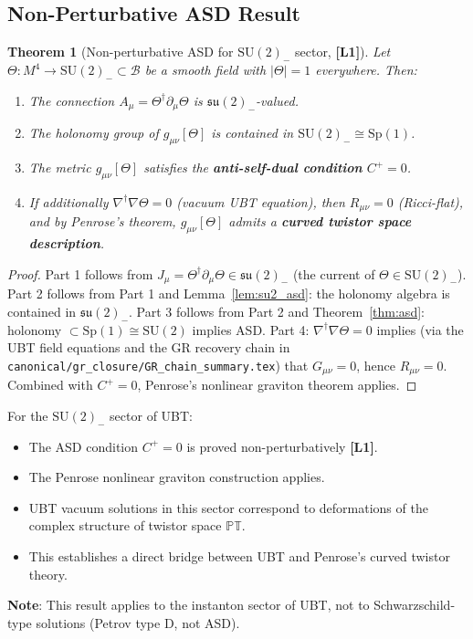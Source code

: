 \documentclass[11pt,a4paper]{article}
\newtheorem{theorem}{Theorem}[section]
\theoremstyle{definition}
\theoremstyle{remark}
\begin{document}
\subsection{Non-Perturbative ASD Result}

\begin{theorem}[Non-perturbative ASD for $\mathrm{SU}(2)_-$ sector, \textbf{[L1]}]
\label{thm:asd_nonperturbative}
Let $\Theta: M^4 \to \mathrm{SU}(2)_- \subset \mathcal{B}$ be a smooth
field with $|\Theta| = 1$ everywhere.  Then:
\begin{enumerate}
  \item The connection $A_\mu = \Theta^\dagger\partial_\mu\Theta$ is
        $\mathfrak{su}(2)_-$-valued.
  \item The holonomy group of $g_{\mu\nu}[\Theta]$ is contained in
        $\mathrm{SU}(2)_- \cong \mathrm{Sp}(1)$.
  \item The metric $g_{\mu\nu}[\Theta]$ satisfies the \textbf{anti-self-dual
        condition} $C^+ = 0$.
  \item If additionally $\nabla^\dagger\nabla\Theta = 0$ (vacuum UBT equation),
        then $R_{\mu\nu} = 0$ (Ricci-flat), and by Penrose's theorem,
        $g_{\mu\nu}[\Theta]$ admits a \textbf{curved twistor space description}.
\end{enumerate}
\end{theorem}

\begin{proof}
Part 1 follows from $J_\mu = \Theta^\dagger\partial_\mu\Theta \in \mathfrak{su}(2)_-$
(the current of $\Theta \in \mathrm{SU}(2)_-$).
Part 2 follows from Part 1 and Lemma~\ref{lem:su2_asd}: the holonomy algebra
is contained in $\mathfrak{su}(2)_-$.
Part 3 follows from Part 2 and Theorem~\ref{thm:asd}: holonomy $\subset
\mathrm{Sp}(1) \cong \mathrm{SU}(2)$ implies ASD.
Part 4: $\nabla^\dagger\nabla\Theta = 0$ implies (via the UBT field equations
and the GR recovery chain in \texttt{canonical/gr\_closure/GR\_chain\_summary.tex})
that $G_{\mu\nu} = 0$, hence $R_{\mu\nu} = 0$.  Combined with $C^+ = 0$,
Penrose's nonlinear graviton theorem applies.
\end{proof}

\begin{tcolorbox}[colback=blue!5!white,colframe=blue!50!black,
                  title={Consequence: UBT and Twistor Theory}]
For the $\mathrm{SU}(2)_-$ sector of UBT:
\begin{itemize}
  \item The ASD condition $C^+ = 0$ is proved non-perturbatively \textbf{[L1]}.
  \item The Penrose nonlinear graviton construction applies.
  \item UBT vacuum solutions in this sector correspond to deformations of
        the complex structure of twistor space $\mathbb{PT}$.
  \item This establishes a direct bridge between UBT and Penrose's curved
        twistor theory.
\end{itemize}
\textbf{Note}: This result applies to the instanton sector of UBT, not to
Schwarzschild-type solutions (Petrov type D, not ASD).
\end{tcolorbox}
\end{document}
